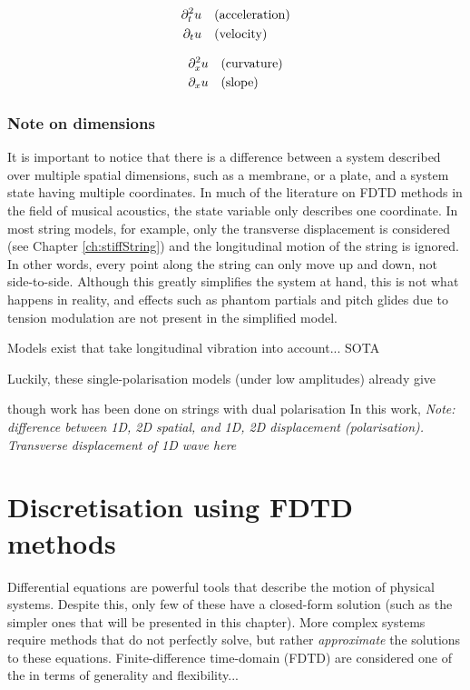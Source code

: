\begin{minipage}[c]{0.49\textwidth}
    \begin{align*}
        \partial_t^2 u &\quad \text{(acceleration)}\\
        \partial_t u &\quad \text{(velocity)}
    \end{align*}
\end{minipage}
\begin{minipage}[c]{0.49\textwidth}
    \begin{align*}
    \partial_x^2 u &\quad \text{(curvature)}\\
    \partial_x u &\quad \text{(slope)}
    \end{align*}
\end{minipage}
\subsubsection{Note on dimensions }
It is important to notice that there is a difference between a system described over multiple spatial dimensions, such as a membrane, or a plate, and a system state having multiple coordinates. In much of the literature on FDTD methods in the field of musical acoustics, the state variable only describes one coordinate. In most string models, for example, only the transverse displacement is considered (see Chapter \ref{ch:stiffString}) and the longitudinal motion of the string is ignored. In other words, every point along the string can only move up and down, not side-to-side. Although this greatly simplifies the system at hand, this is not what happens in reality, and effects such as phantom partials and pitch glides due to tension modulation are not present in the simplified model. 

Models exist that take longitudinal vibration into account... SOTA

Luckily, these single-polarisation models (under low amplitudes) already give 

though work has been done on strings with dual polarisation \cite{Desvages2016}
In this work,  
\textit{Note: difference between 1D, 2D spatial, and 1D, 2D displacement (polarisation). Transverse displacement of 1D wave here}

\section{Discretisation using FDTD methods}
Differential equations are powerful tools that describe the motion of physical systems. Despite this, only few of these have a closed-form \SWcomment[or analytical] solution (such as the simpler ones that will be presented in this chapter). More complex systems require methods that do not perfectly solve, but rather \textit{approximate} the solutions to these equations. Finite-difference time-domain (FDTD) are considered one of the
in terms of generality and flexibility... 

